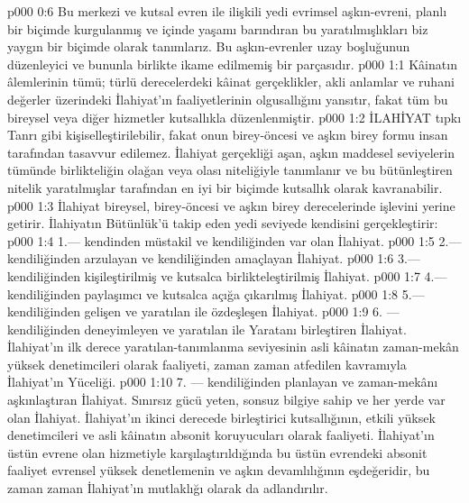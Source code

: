\vs p000 0:6 Bu merkezi ve kutsal evren ile ilişkili yedi evrimsel aşkın\hyp{}evreni, planlı bir biçimde kurgulanmış ve içinde yaşamı barındıran bu yaratılmışlıkları biz yaygın bir biçimde  olarak tanımlarız. Bu aşkın\hyp{}evrenler uzay boşluğunun düzenleyici ve bununla birlikte ikame edilmemiş  bir parçasıdır.
\vs p000 1:1 Kâinatın âlemlerinin tümü; türlü derecelerdeki kâinat gerçeklikler, akli anlamlar ve ruhani değerler üzerindeki İlahiyat’ın faaliyetlerinin olgusallığını yansıtır, fakat tüm bu bireysel veya diğer hizmetler kutsallıkla düzenlenmiştir.
\vs p000 1:2 İLAHİYAT tıpkı Tanrı gibi kişiselleştirilebilir, fakat onun birey\hyp{}öncesi ve aşkın birey formu insan tarafından tasavvur edilemez. İlahiyat gerçekliği aşan, aşkın maddesel seviyelerin tümünde birlikteliğin olağan veya olası niteliğiyle tanımlanır ve bu bütünleştiren nitelik yaratılmışlar tarafından en iyi bir biçimde kutsallık olarak kavranabilir.
\vs p000 1:3 İlahiyat bireysel, birey\hyp{}öncesi ve aşkın birey derecelerinde işlevini yerine getirir. İlahiyatın Bütünlük’ü takip eden yedi seviyede kendisini gerçekleştirir:
\vs p000 1:4 1.\bibnobreakspace {}--- kendinden müstakil ve kendiliğinden var olan İlahiyat.
\vs p000 1:5 2.\bibnobreakspace {}--- kendiliğinden arzulayan ve kendiliğinden amaçlayan İlahiyat.
\vs p000 1:6 3.\bibnobreakspace {}--- kendiliğinden kişileştirilmiş ve kutsalca birlikteleştirilmiş İlahiyat.
\vs p000 1:7 4.\bibnobreakspace {}--- kendiliğinden paylaşımcı ve kutsalca açığa çıkarılmış İlahiyat.
\vs p000 1:8 5.\bibnobreakspace {}--- kendiliğinden gelişen ve yaratılan ile özdeşleşen İlahiyat.
\vs p000 1:9 6.\bibnobreakspace {} --- kendiliğinden deneyimleyen ve yaratılan ile Yaratanı birleştiren İlahiyat. İlahiyat’ın ilk derece yaratılan\hyp{}tanımlanma seviyesinin asli kâinatın zaman\hyp{}mekân yüksek denetimcileri olarak faaliyeti, zaman zaman atfedilen kavramıyla İlahiyat’ın Yüceliği.
\vs p000 1:10 7.\bibnobreakspace {} --- kendiliğinden planlayan ve zaman\hyp{}mekânı aşkınlaştıran İlahiyat. Sınırsız gücü yeten, sonsuz bilgiye sahip ve her yerde var olan İlahiyat. İlahiyat’ın ikinci derecede birleştirici kutsallığının, etkili yüksek denetimcileri ve asli kâinatın absonit koruyucuları olarak faaliyeti. İlahiyat’ın üstün evrene olan hizmetiyle karşılaştırıldığında bu üstün evrendeki absonit faaliyet evrensel yüksek denetlemenin ve aşkın devamlılığının eşdeğeridir, bu zaman zaman İlahiyat’ın mutlaklığı olarak da adlandırılır.
